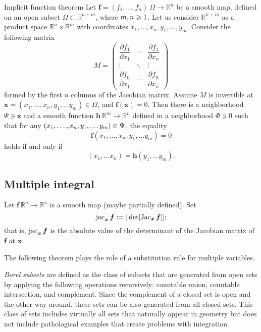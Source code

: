 \begin{thm}{Implicit function theorem}\label{thm:imlicit}
Let $\bm{f}=(f_1,\dots,f_n)\:\Omega\to\mathbb{R}^n$ be a smooth map, defined on an open subset $\Omega\subset\mathbb{R}^{n+m}$, where
$m,n\z\ge 1$.
Let us consider $\mathbb{R}^{n+m}$ as a product space $\mathbb{R}^n\times \mathbb{R}^m$ with coordinates 
$x_1,\dots,x_n,y_1,\dots,y_m$.
Consider the following matrix 
\[
M=\begin{pmatrix}
\dfrac{\partial f_1}{\partial x_1} & \cdots & \dfrac{\partial f_1}{\partial x_n}\\
\vdots & \ddots & \vdots\\
\dfrac{\partial f_n}{\partial x_1} & \cdots & \dfrac{\partial f_n}{\partial x_n} \end{pmatrix}\]
formed by the first $n$ columns of the Jacobian matrix.
Assume $M$ is invertible at $\bm{x}=(x_1,\dots,x_n,y_1,\dots y_m)\in \Omega$, and $\bm{f}(\bm{x})=0$.
Then there is a neighborhood $\Psi\ni \bm{x}$
and a smooth function $\bm{h}\:\mathbb{R}^m\to\mathbb{R}^n$ defined in a neighborhood $\Phi\ni 0$ such that
for any $(x_1,\dots,x_n,y_1,\dots y_m)\z\in \Psi$, the equality
\[\bm{f}(x_1,\dots,x_n,y_1,\dots y_m)=0\]
holds if and only if 
\[(x_1,\dots x_n)=\bm{h}(y_1,\dots y_m).\]

\end{thm}

\subsection*{Multiple integral}

Let $\bm{f}\:\mathbb{R}^n\to\mathbb{R}^n$ is a smooth map (maybe partially defined).
Set
\[\jac_{\bm{x}}\bm{f}\df|\det[\Jac_{\bm{x}}\bm{f}]|;
\index{10j@$\jac$ (Jacobian determinant)}\]
that is, $\mathop{\rm jac}\nolimits_{\bm{x}}\bm{f}$ is the absolute value of the determinant of the Jacobian matrix of $\bm{f}$ at $\bm{x}$.

The following theorem plays the role of a substitution rule for multiple variables.

\emph{Borel subsets} are defined as the class of subsets that are generated from open sets by applying the following operations recursively: countable union, countable intersection, and complement.
Since the complement of a closed set is open and the other way around, these sets can be also generated from all closed sets.
This class of sets includes virtually all sets that naturally appear in geometry but does not include pathological examples that create problems with integration.

